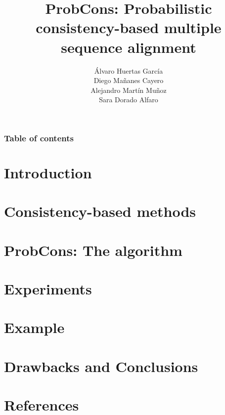 \documentclass[11pt]{beamer}
\title[ProbCons]{ProbCons: Probabilistic consistency-based multiple sequence alignment}
\author[PCALG - Presentation]{Álvaro Huertas García \\ Diego Mañanes Cayero
                 \\ Alejandro Martín Muñoz \\ Sara Dorado Alfaro}
\begin{document}
\frame{\titlepage}
\begin{frame}
    \frametitle{Table of contents}
    \tableofcontents
\end{frame}


\section{Introduction} 


\section{Consistency-based methods} 


\section{ProbCons: The algorithm}


\section{Experiments}


\section{Example} 


\section{Drawbacks and Conclusions}





\section{References}


\frame{\titlepage}
\end{document}
